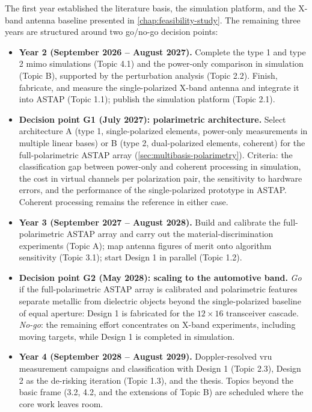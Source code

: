 The first year established the literature basis, the simulation platform, and the X-band antenna baseline presented in \cref{chap:feasibility-study}.
The remaining three years are structured around two go/no-go decision points:
\begin{itemize}
    \item \textbf{Year 2 (September 2026 -- August 2027).}
    Complete the type 1 and type 2 \gls{mimo} simulations (Topic 4.1) and the power-only comparison in simulation (Topic B), supported by the perturbation analysis (Topic 2.2).
    Finish, fabricate, and measure the single-polarized X-band antenna and integrate it into ASTAP (Topic 1.1); publish the simulation platform (Topic 2.1).
    \item \textbf{Decision point G1 (July 2027): polarimetric architecture.}
    Select architecture A (type 1, single-polarized elements, power-only measurements in multiple linear bases) or B (type 2, dual-polarized elements, coherent) for the full-polarimetric ASTAP array (\cref{sec:multibasis-polarimetry}).
    Criteria: the classification gap between power-only and coherent processing in simulation, the cost in virtual channels per polarization pair, the sensitivity to hardware errors, and the performance of the single-polarized prototype in ASTAP.
    Coherent processing remains the reference in either case.
    \item \textbf{Year 3 (September 2027 -- August 2028).}
    Build and calibrate the full-polarimetric ASTAP array and carry out the material-discrimination experiments (Topic A); map antenna figures of merit onto algorithm sensitivity (Topic 3.1); start Design 1 in parallel (Topic 1.2).
    \item \textbf{Decision point G2 (May 2028): scaling to the automotive band.}
    \textit{Go} if the full-polarimetric ASTAP array is calibrated and polarimetric features separate metallic from dielectric objects beyond the single-polarized baseline of equal aperture: Design 1 is fabricated for the $12 \times 16$ transceiver cascade.
    \textit{No-go}: the remaining effort concentrates on X-band experiments, including moving targets, while Design 1 is completed in simulation.
    \item \textbf{Year 4 (September 2028 -- August 2029).}
    Doppler-resolved \gls{vru} measurement campaigns and classification with Design 1 (Topic 2.3), Design 2 as the de-risking iteration (Topic 1.3), and the thesis.
    Topics beyond the basic frame (3.2, 4.2, and the extensions of Topic B) are scheduled where the core work leaves room.
\end{itemize}

